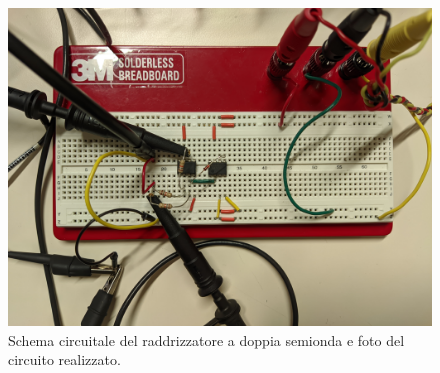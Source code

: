 \begin{figure}[ht!]
\begin{minipage}{.45\textwidth}
		\includegraphics[width=\linewidth]{./ImageFiles/Laboratorio 3/CIR21.jpg}
	\end{minipage}
	\caption{Schema circuitale del raddrizzatore a doppia semionda e foto del circuito realizzato.}
	\label{fig:circuito_1}
\end{figure}

